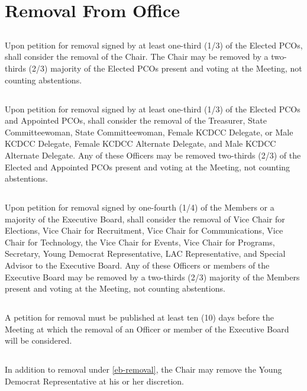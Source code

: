 \section{Removal From Office}
\subsection{}
Upon petition for removal signed by at least one-third (1/3) of the Elected PCOs, \thedistrict{} shall consider the removal of the Chair. The Chair may be removed by a two-thirds (2/3) majority of the Elected PCOs present and voting at the Meeting, not counting abstentions.

\subsection{}
Upon petition for removal signed by at least one-third (1/3) of the Elected PCOs and Appointed PCOs, \thedistrict{} shall consider the removal of the Treasurer, State Committeewoman, State Committeewoman, Female KCDCC Delegate, or Male KCDCC Delegate, Female KCDCC Alternate Delegate, and Male KCDCC Alternate Delegate. Any of these Officers may be removed two-thirds (2/3) of the Elected and Appointed PCOs present and voting at the Meeting, not counting abstentions.

\subsection{} \label{eb-removal}
Upon petition for removal signed by one-fourth (1/4) of the Members or a majority of the Executive Board, \thedistrict{} shall consider the removal of Vice Chair for Elections, Vice Chair for Recruitment, Vice Chair for Communications, Vice Chair for Technology, the Vice Chair for Events, Vice Chair for Programs, Secretary, Young Democrat Representative, LAC Representative, and Special Advisor to the Executive Board. Any of these Officers or members of the Executive Board may be removed by a two-thirds (2/3) majority of the Members present and voting at the Meeting, not counting abstentions.

\subsection{}
A petition for removal must be published at least ten (10) days before the Meeting at which the removal of an Officer or member of the Executive Board will be considered.

\subsection{}
In addition to removal under \autoref{eb-removal}, the Chair may remove the Young Democrat Representative at his or her discretion.

